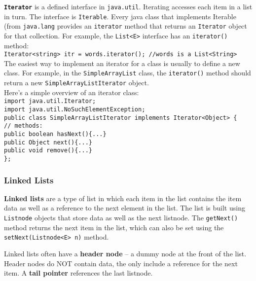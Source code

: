 \texttt{\textbf{Iterator}} is a defined interface in \texttt{java.util}. Iterating accesses each item in a list in turn. The interface is \texttt{Iterable}. Every java class that implements Iterable (from \texttt{java.lang} provides an \texttt{iterator} method that returns an \texttt{Iterator} object for that collection. For example, the \texttt{List<E>} interface has an \texttt{iterator()} method: \\

\texttt{Iterator<string> itr = words.iterator(); //words is a List<String>} \\

The easiest way to implement an iterator for a class is usually to define a new class. For example, in the \texttt{SimpleArrayList} class, the \texttt{iterator()} method should return a new \texttt{SimpleArrayListIterator} object. \\

Here's a simple overview of an iterator class: \\

\texttt{import java.util.Iterator;} \\
\indent \texttt{import java.util.NoSuchElementException;} \\
\indent \texttt{public class SimpleArrayListIterator implements Iterator<Object> \{} \\
\indent \indent \texttt{// methods:} \\
\indent \indent \texttt{public boolean hasNext()\{...\}} \\
\indent \indent \texttt{public Object next()\{...\}} \\
\indent \indent \texttt{public void remove()\{...\}} \\
\indent \texttt{\};} \\

\subsubsection{Linked Lists}

\textbf{Linked lists} are a type of list in which each item in the list contains the item data as well as a reference to the next element in the list. The list is built using \texttt{Listnode} objects that store data as well as the next listnode. The \texttt{getNext()} method returns the next item in the list, which can also be set using the \texttt{setNext(Listnode<E> n)} method. 

Linked lists often have a \textbf{header node} -- a dummy node at the front of the list. Header nodes do NOT contain data, the only include a reference for the next item. A \textbf{tail pointer} references the last listnode. 

